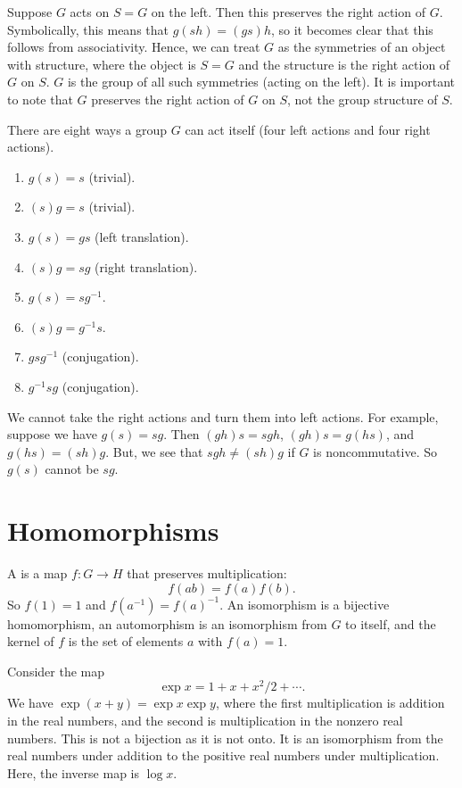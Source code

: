 \documentclass[11pt, oneside]{amsart}
\begin{document}
Suppose $G$ acts on $S=G$ on the left. Then this preserves the right action of $G$. Symbolically, this means that $g(sh) = (gs)h$, so it becomes clear that this follows from associativity. Hence, we can treat $G$ as the symmetries of an object with structure, where the object is $S=G$ and the structure is the right action of $G$ on $S$. $G$ is the group of all such symmetries (acting on the left). It is important to note that $G$ preserves the right action of $G$ on $S$, not the group structure of $S$.


There are eight ways a group $G$ can act itself (four left actions and four right actions). 
\begin{enumerate}
\item $g(s) = s$ (trivial).
\item $(s)g = s$ (trivial).
\item $g(s) = gs$ (left translation).
\item $(s)g = sg$ (right translation).
\item $g(s) = sg^{-1}$.
\item $(s)g = g^{-1}s$.
\item $gsg^{-1} $ (conjugation).
\item $g^{-1}sg$ (conjugation).
\end{enumerate}
We cannot take the right actions and turn them into left actions. For example, suppose we have $g(s) = sg$. Then $(gh)s = sgh$, $(gh)s = g(hs)$, and $g(hs) = (sh)g$. But, we see that $sgh\neq (sh)g$ if $G$ is noncommutative. So $g(s)$ cannot be $sg$.
\section{Homomorphisms}
A  is a map $f:G\longrightarrow H$ that preserves multiplication:
$$
f(ab) = f(a)f(b).
$$
So $f(1) = 1$ and $f(a^{-1}) = f(a)^{-1}$. An isomorphism is a bijective homomorphism, an automorphism is an isomorphism from $G$ to itself, and the kernel of $f$ is the set of elements $a$ with $f(a)=1$. 

Consider the map
$$
\exp x = 1 + x + {x^2}/{2}+\cdots.
$$
We have $\exp(x+y) = \exp x \exp y$, where the first multiplication is addition in the real numbers, and the second is multiplication in the nonzero real numbers. This is not a bijection as it is not onto. It is an isomorphism from the real numbers under addition to the positive real numbers under multiplication. Here, the inverse map is $\log x$.
\end{document}
